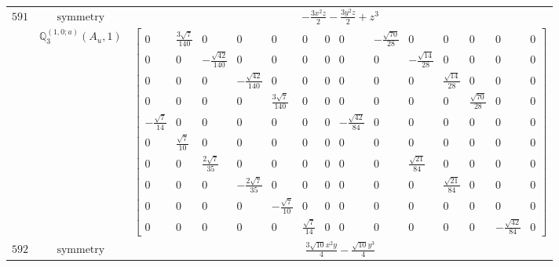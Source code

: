 \documentclass[fleqn,8pt,landscape]{jsarticle}
\begin{document}
\begin{longtable}{ccc}
$ 591 $ & $ \text{symmetry} $ & $ - \frac{3 x^{2} z}{2} - \frac{3 y^{2} z}{2} + z^{3} $ \\
$  $ & $ \mathbb{Q}_{3}^{(1,0;a)}(A_{u},1) $ & $ \begin{bmatrix} 0 & \frac{3 \sqrt{7}}{140} & 0 & 0 & 0 & 0 & 0 & 0 & - \frac{\sqrt{70}}{28} & 0 & 0 & 0 & 0 & 0 \\ 0 & 0 & - \frac{\sqrt{42}}{140} & 0 & 0 & 0 & 0 & 0 & 0 & - \frac{\sqrt{14}}{28} & 0 & 0 & 0 & 0 \\ 0 & 0 & 0 & - \frac{\sqrt{42}}{140} & 0 & 0 & 0 & 0 & 0 & 0 & \frac{\sqrt{14}}{28} & 0 & 0 & 0 \\ 0 & 0 & 0 & 0 & \frac{3 \sqrt{7}}{140} & 0 & 0 & 0 & 0 & 0 & 0 & \frac{\sqrt{70}}{28} & 0 & 0 \\ - \frac{\sqrt{7}}{14} & 0 & 0 & 0 & 0 & 0 & 0 & - \frac{\sqrt{42}}{84} & 0 & 0 & 0 & 0 & 0 & 0 \\ 0 & \frac{\sqrt{7}}{10} & 0 & 0 & 0 & 0 & 0 & 0 & 0 & 0 & 0 & 0 & 0 & 0 \\ 0 & 0 & \frac{2 \sqrt{7}}{35} & 0 & 0 & 0 & 0 & 0 & 0 & \frac{\sqrt{21}}{84} & 0 & 0 & 0 & 0 \\ 0 & 0 & 0 & - \frac{2 \sqrt{7}}{35} & 0 & 0 & 0 & 0 & 0 & 0 & \frac{\sqrt{21}}{84} & 0 & 0 & 0 \\ 0 & 0 & 0 & 0 & - \frac{\sqrt{7}}{10} & 0 & 0 & 0 & 0 & 0 & 0 & 0 & 0 & 0 \\ 0 & 0 & 0 & 0 & 0 & \frac{\sqrt{7}}{14} & 0 & 0 & 0 & 0 & 0 & 0 & - \frac{\sqrt{42}}{84} & 0 \end{bmatrix} $ \\ \hline
$ 592 $ & $ \text{symmetry} $ & $ \frac{3 \sqrt{10} x^{2} y}{4} - \frac{\sqrt{10} y^{3}}{4} $ \\

\end{longtable}
\end{document}
